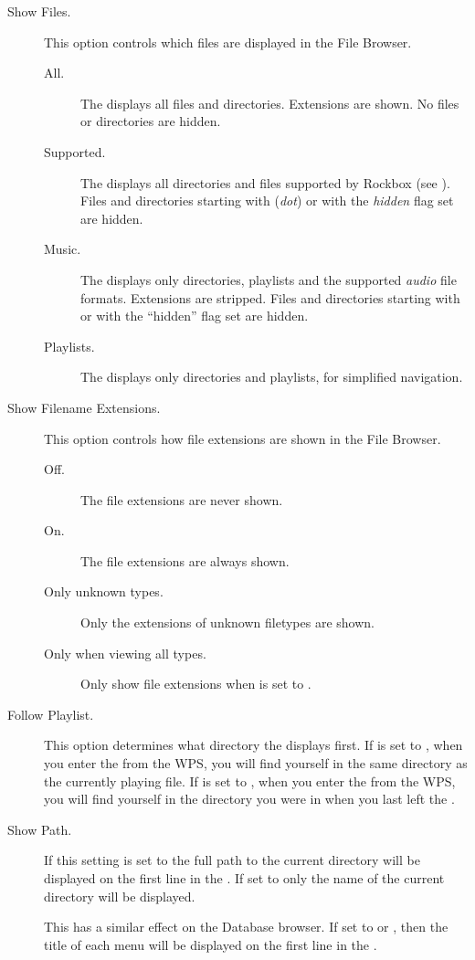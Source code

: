 \begin{description}
  
\item[\label{ref:ShowFiles}Show Files.]
  This option controls which files are displayed in the File Browser.
  \begin{description}
  \item[All.] The  displays all files and directories.
    Extensions are shown. No files or directories are hidden.
  \item[Supported.] The  displays all directories and
    files supported by Rockbox (see ).
    Files and directories starting with  (\emph{dot}) or with the 
    \emph{hidden} flag set are hidden.
  \item[Music.] The  displays only directories, playlists and
    the supported \emph{audio} file formats. Extensions are stripped. Files and
    directories starting with  or with the ``hidden'' flag set are
    hidden.
  \item[Playlists.] The  displays only directories and playlists,
    for simplified navigation.
  \end{description}

\item[\label{ref:ShowExtensions}Show Filename Extensions.]
  This option controls how file extensions are shown in the File Browser.
  \begin{description}
  \item[Off.] The file extensions are never shown.
  \item[On.] The file extensions are always shown.
  \item[Only unknown types.] Only the extensions of unknown filetypes are shown.
  \item[Only when viewing all types.] Only show file extensions when
       is set to .
  \end{description}
  
\item[Follow Playlist.] 
  This option determines what directory the  displays
  first. If  is set to , when you enter
  the  from the WPS, you will find yourself in the same
  directory as the currently playing file. If  is set
  to , when you enter the  from the WPS, you
  will find yourself in the directory you were in when you last left the
  .

\item[Show Path.]
  If this setting is set to  the full path to the current
  directory will be displayed on the first line in the .
  If set to  only the name of the current
  directory will be displayed.
  
  This has a similar effect on the Database browser. If set to
   or , then the title of
  each menu will be displayed on the first line in the .

\end{description}

